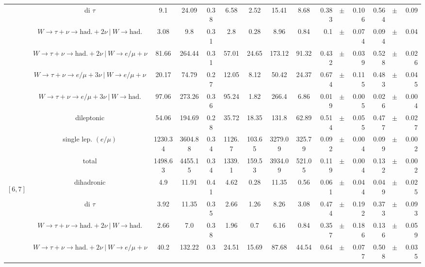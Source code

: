 \documentclass[12pt]{paper}
\begin{document}
\begin{table}[ht]
\begin{center}
{\begin{tabular}{|c|c|c|c|c|c|c|c|c|rrr|rrr|}
\cline{2-15}
 &di $\tau$ & 9.1 & 24.09 & 0.38 & 6.58 & 2.52 & 15.41 & 8.68 & 0.383 & $\pm$ & 0.106 & 0.564 & $\pm$ & 0.09\\
\cline{2-15}
 &$W\rightarrow \tau + \nu \rightarrow \textrm{had.}+2\nu ~|~ W \rightarrow \textrm{had.}$ & 3.08 & 9.8 & 0.31 & 2.8 & 0.28 & 8.96 & 0.84 & 0.1 & $\pm$ & 0.074 & 0.094 & $\pm$ & 0.04\\
\cline{2-15}
 &$W\rightarrow \tau + \nu \rightarrow \textrm{had.}+2\nu ~|~ W \rightarrow e/\mu + \nu$ & 81.66 & 264.44 & 0.31 & 57.01 & 24.65 & 173.12 & 91.32 & 0.432 & $\pm$ & 0.039 & 0.528 & $\pm$ & 0.026\\
\cline{2-15}
 &$W\rightarrow \tau + \nu \rightarrow e/\mu+3\nu ~|~ W \rightarrow e/\mu + \nu$ & 20.17 & 74.79 & 0.27 & 12.05 & 8.12 & 50.42 & 24.37 & 0.674 & $\pm$ & 0.115 & 0.483 & $\pm$ & 0.045\\
\cline{2-15}
 &$W\rightarrow \tau + \nu \rightarrow e/\mu+3\nu ~|~ W \rightarrow \textrm{had.}$ & 97.06 & 273.26 & 0.36 & 95.24 & 1.82 & 266.4 & 6.86 & 0.019 & $\pm$ & 0.005 & 0.026 & $\pm$ & 0.004\\
\cline{2-15}
 &dileptonic & 54.06 & 194.69 & 0.28 & 35.72 & 18.35 & 131.8 & 62.89 & 0.514 & $\pm$ & 0.055 & 0.477 & $\pm$ & 0.027\\
\cline{2-15}
 &single lep. $(e/\mu)$ & 1230.34 & 3604.88 & 0.34 & 1126.7 & 103.65 & 3279.09 & 325.79 & 0.092 & $\pm$ & 0.004 & 0.099 & $\pm$ & 0.002\\
\cline{2-15}
 &total & 1498.63 & 4455.15 & 0.34 & 1339.1 & 159.53 & 3934.09 & 521.05 & 0.119 & $\pm$ & 0.004 & 0.132 & $\pm$ & 0.002\\
\hline
\hline\multirow{9}{*}{\begin{sideways}$[6,7]$\end{sideways}}
 &dihadronic & 4.9 & 11.91 & 0.41 & 4.62 & 0.28 & 11.35 & 0.56 & 0.061 & $\pm$ & 0.044 & 0.049 & $\pm$ & 0.025\\
\cline{2-15}
 &di $\tau$ & 3.92 & 11.35 & 0.35 & 2.66 & 1.26 & 8.26 & 3.08 & 0.474 & $\pm$ & 0.192 & 0.373 & $\pm$ & 0.093\\
\cline{2-15}
 &$W\rightarrow \tau + \nu \rightarrow \textrm{had.}+2\nu ~|~ W \rightarrow \textrm{had.}$ & 2.66 & 7.0 & 0.38 & 1.96 & 0.7 & 6.16 & 0.84 & 0.357 & $\pm$ & 0.186 & 0.136 & $\pm$ & 0.059\\
\cline{2-15}
 &$W\rightarrow \tau + \nu \rightarrow \textrm{had.}+2\nu ~|~ W \rightarrow e/\mu + \nu$ & 40.2 & 132.22 & 0.3 & 24.51 & 15.69 & 87.68 & 44.54 & 0.64 & $\pm$ & 0.077 & 0.508 & $\pm$ & 0.035\\

\end{tabular}}
\end{center}
\end{table}
\end{document}
